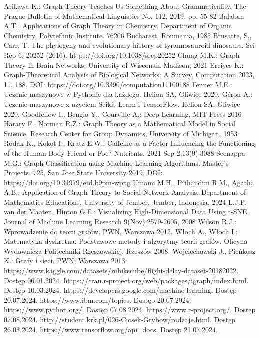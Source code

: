 
\begin{thebibliography}{4}
     Arikawa K.: Graph Theory Teaches Us Something About Grammaticality. The Prague Bulletin of Mathematical Linguistics No. 112, 2019, pp. 55-82
     Balaban A.T.: Applications of Graph Theory in Chemistry. Department of Organic Chemistry, Polytefhnic Institute. 76206 Bucharest, Roumania, 1985
     Brusatte, S., Carr, T. The phylogeny and evolutionary history of tyrannosauroid dinosaurs. Sci Rep 6, 20252 (2016). https://doi.org/10.1038/srep20252
     Chung M.K.: Graph Theory in Brain Networks, University of Wisconsin-Madison, 2021 
     Erciyes K.: Graph-Theoretical Analysis of Biological Networks: A Survey. Computation 2023, 11, 188, DOI: https://doi.org/10.3390/computation11100188
     Fenner M.E.: Uczenie maszynowe w Pythonie dla każdego. Helion SA, Gliwice 2020.
     Géron A.: Uczenie maszynowe z użyciem Scikit-Learn i TensorFlow. Helion SA, Gliwice 2020.
     Goodfellow I., Bengio Y., Courville A.: Deep Learning, MIT Press 2016
     Harary F., Norman R.Z.: Graph Theory as a Mathematical Model in Social Science, Research Center for Group Dynamics, University of Michigan, 1953
     Rodak K., Kokot I., Kratz E.W.: Caffeine as a Factor Influencing the Functioning of the Human Body-Friend or Foe? Nutrients. 2021 Sep 2;13(9):3088
     Seenappa M.G.: Graph Classification using Machine Learning Algorithms. Master's Projects. 725, San Jose State University 2019, DOI: https://doi.org/10.31979/etd.b9pm-wpng
     Umami M.H., Prihandini R.M., Agatha A.B.: Application of Graph Theory to Social Network Analysis, Department of Mathematics Educations, University of Jember, Jember, Indonesia, 2024
     L.J.P. van der Maaten, Hinton G.E.: Visualizing High-Dimensional Data Using t-SNE. Journal of Machine Learning Research 9(Nov):2579-2605, 2008
     Wilson R.J.: Wprowadzenie do teorii grafów. PWN, Warszawa 2012.
     Włoch A., Włoch I.: Matematyka dyskretna. Podstawowe metody i algorytmy teorii grafów. Oficyna Wydawnicza Politechniki Rzeszowskiej, Rzeszów 2008.
     Wojciechowski J., Pieńkosz K.: Grafy i sieci. PWN, Warszawa 2013.
     https://www.kaggle.com/datasets/robikscube/flight-delay-dataset-20182022. Dostęp 06.01.2024.
     https://cran.r-project.org/web/packages/igraph/index.html. Dostęp 10.03.2024.
     https://developers.google.com/machine-learning. Dostęp 20.07.2024.
     https://www.ibm.com/topics. Dostęp 20.07.2024.
     https://www.python.org/. Dostęp 07.08.2024.
     https://www.r-project.org/. Dostęp 07.08.2024.
     http://student.krk.pl/026-Ciosek-Grybow/rodzaje.html. Dostęp 26.03.2024.
     https://www.tensorflow.org/api\_docs. Dostęp 21.07.2024.
\end{thebibliography}